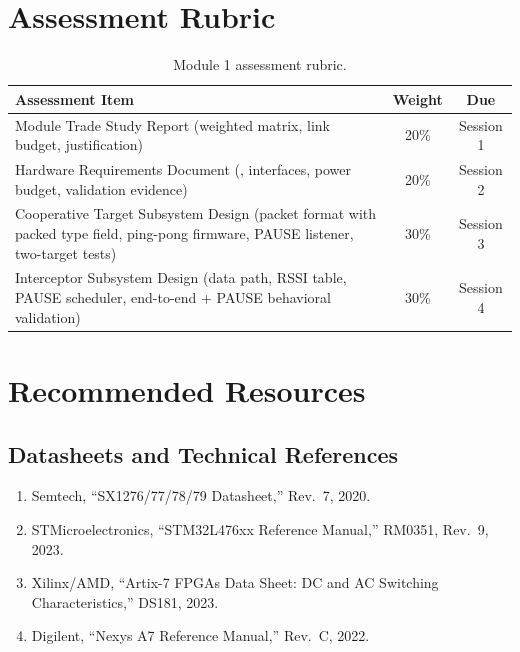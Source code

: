 \documentclass[11pt,letterpaper]{article}
\begin{document}
	\section{Assessment Rubric}

	\begin{table}[ht!]
		\centering
		\caption{Module 1 assessment rubric.}
		\label{tab:rubric}
		\renewcommand{\arraystretch}{1.3}
		\begin{tabularx}{\textwidth}{X c c}
			\toprule
			\textbf{Assessment Item} & \textbf{Weight} & \textbf{Due} \\
			\midrule
			\RF{} Module Trade Study Report (weighted matrix, link budget, justification) & 20\% & Session 1 \\
			Hardware Requirements Document (\BOM{}, interfaces, power budget, validation evidence) & 20\% & Session 2 \\
			Cooperative Target Subsystem Design (packet format with packed type field, ping-pong firmware, PAUSE listener, two-target tests) & 30\% & Session 3 \\
			Interceptor Subsystem Design (data path, RSSI table, PAUSE scheduler, end-to-end + PAUSE behavioral validation) & 30\% & Session 4 \\
			\bottomrule
		\end{tabularx}
	\end{table}
	
	
	\newpage
	\section{Recommended Resources}\label{sec:resources}

	\subsection{Datasheets and Technical References}
	
	\begin{enumerate}[leftmargin=2em]
		\item Semtech, ``SX1276/77/78/79 Datasheet,'' Rev.\ 7, 2020.
		\item STMicroelectronics, ``STM32L476xx Reference Manual,'' RM0351, Rev.\ 9, 2023.
		\item Xilinx/AMD, ``Artix-7 FPGAs Data Sheet: DC and AC Switching Characteristics,'' DS181, 2023.
		\item Digilent, ``Nexys A7 Reference Manual,'' Rev.\ C, 2022.
	\end{enumerate}
	
\end{document}
